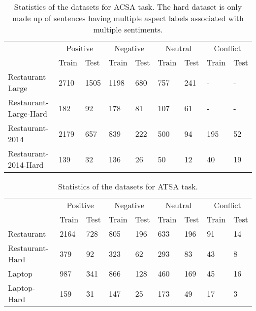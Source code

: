\documentclass[11pt,a4paper]{article}
\begin{document}
\begin{table*}[ht]
\centering
\begin{tabular}{l|ll|ll|ll|ll}
\hline
\multirow{2}{*}{} & \multicolumn{2}{c|}{Positive} & \multicolumn{2}{c|}{Negative} & \multicolumn{2}{c|}{Neutral} & \multicolumn{2}{c}{Conflict} \\ 
\cline{2-9} 
                 & Train      & Test      & Train      & Test      & Train      & Test      & Train      & Test \\ \hline
Restaurant-Large & 2710       & 1505      & 1198       & 680       & 757        & 241       & -          & -    \\
Restaurant-Large-Hard & 182   & 92        & 178        & 81        & 107        & 61        & -          & -    \\ \hline
Restaurant-2014  & 2179    & 657   & 839   & 222  & 500   & 94   & 195    & 52   \\ 
Restaurant-2014-Hard  & 139   & 32        & 136        & 26        & 50         & 12        & 40         & 19   \\
\hline
\end{tabular}
\caption{Statistics of the datasets for ACSA task. The hard dataset is only made up of sentences having multiple aspect labels associated with multiple sentiments.}
\label{tbl:r14r16}
\end{table*}

\begin{table*}[ht]
\centering
\begin{tabular}{l|ll|ll|ll|ll}
\hline
\multirow{2}{*}{} & \multicolumn{2}{c|}{Positive} & \multicolumn{2}{c|}{Negative} & \multicolumn{2}{c|}{Neutral} & \multicolumn{2}{c}{Conflict}  \\ \cline{2-9} 
                 & Train   & Test  & Train & Test & Train & Test & Train  & Test \\ \hline
Restaurant       & 2164    & 728   & 805   & 196  & 633   & 196   & 91    & 14   \\ 
Restaurant-Hard  & 379     & 92    & 323   & 62   & 293   & 83   & 43     & 8    \\ \hline
Laptop           & 987     & 341   & 866   & 128  & 460   & 169  & 45     & 16   \\
Laptop-Hard      & 159     & 31    & 147   & 25   & 173   & 49   & 17     & 3    \\
\hline
\end{tabular}
\caption{Statistics of the datasets for ATSA task.}
\label{tbl:atsa2014}
\end{table*}
\end{document}
